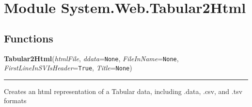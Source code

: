 %
%
%


\section{Module System.Web.Tabular2Html}

    \label{System:Web:Tabular2Html}


  \subsection{Functions}

    \label{System:Web:Tabular2Html:Tabular2Html}

    \vspace{0.5ex}

\hspace{.8\funcindent}\begin{boxedminipage}{\funcwidth}

    \raggedright \textbf{Tabular2Html}(\textit{htmlFile}, \textit{ddata}={\tt None}, \textit{FileInName}={\tt None}, \textit{FirstLineInSVIsHeader}={\tt True}, \textit{Title}={\tt None})

    \vspace{-1.5ex}

    \rule{\textwidth}{0.5\fboxrule}
\setlength{\parskip}{2ex}
    Creates an html representation of a Tabular data, including .data, 
    .csv, and .tsv formats

\setlength{\parskip}{1ex}
    \end{boxedminipage}

    \label{System:Web:Tabular2Html:FixCSSName}

